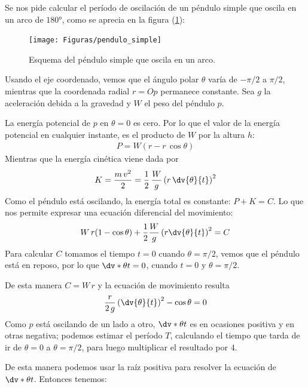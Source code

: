Se nos pide calcular el período de oscilación de un péndulo simple que oscila en un arco de $\ang{180}$, como se aprecia en la figura (\ref{fig:figura_pendulo_simple}):
\begin{figure}[H]
    \centering
    \texttt{[image: Figuras/pendulo\_simple]}
    \caption{Esquema del péndulo simple que oscila en un arco.}
    \label{fig:figura_pendulo_simple}
\end{figure}
Usando el eje coordenado, vemos que el ángulo polar $\theta$ varía de $-\pi/2$ a $\pi/2$, mientras que la coordenada radial $r = Op$ permanece constante. Sea $g$ la aceleración debida a la gravedad y $W$ el peso del péndulo $p$.
\par
La energía potencial de $p$ en $\theta = 0$ es cero. Por lo que el valor de la energía potencial en cualquier instante, es el producto de $W$ por la altura $h$:
\begin{align*}
P = W (r - r \, \cos \theta)
\end{align*}
Mientras que la energía cinética viene dada por
\begin{align*}
K = \dfrac{m \, v^{2}}{2} = \dfrac{1}{2} \, \dfrac{W}{g} \left( r \, \dv{\theta}{t} \right)^{2}
\end{align*}
Como el péndulo está oscilando, la energía total es constante: $P + K = C$. Lo que nos permite expresar una ecuación diferencial del movimiento:
\begin{align*}
W \, r (1 - \cos \theta) + \dfrac{1}{2} \dfrac{W}{g} \left( r \dv{\theta}{t} \right)^{2} = C
\end{align*}
Para calcular $C$ tomamos el tiempo $t = 0$ cuando $\theta = \pi/2$, vemos que el péndulo está en reposo, por lo que $\dv*{\theta}{t} = 0$, cuando $t = 0$ y $\theta = \pi/2$.
\par
De esta manera $C = W \, r$ y la ecuación de movimiento resulta
\begin{align*}
\dfrac{r}{2 \, g} \left( \dv{\theta}{t} \right)^{2} - \cos \theta = 0
\end{align*}
Como $p$ está oscilando de un lado a otro, $\dv*{\theta}{t}$ es en ocasiones positiva y en otras negativa; podemos estimar el período $T$, calculando el tiempo que tarda de ir de $\theta=0$ a $\theta=\pi/2$, para luego multiplicar el resultado por $4$.
\par
De esta manera podemos usar la raíz positiva para resolver la ecuación de $\dv*{\theta}{t}$. Entonces tenemos:
\begingroup
\allowdisplaybreaks
